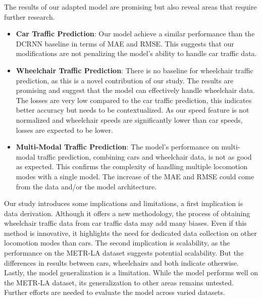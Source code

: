 The results of our adapted model are promising but also reveal areas that require further research.
\begin{itemize}
    \item \textbf{Car Traffic Prediction}:
    Our model achieve a similar performance than the DCRNN baseline in terms of MAE and RMSE\@.
    This suggests that our modifications are not penalizing the model's ability to handle car traffic data.
    \item \textbf{Wheelchair Traffic Prediction}:
    There is no baseline for wheelchair traffic prediction, as this is a novel contribution of our study.
    The results are promising and suggest that the model can effectively handle wheelchair data.
    The losses are very low compared to the car traffic prediction, this indicates better accuracy but needs to be
    contextualized.
    As our speed feature is not normalized and wheelchair speeds are significantly lower than car speeds, losses are
    expected to be lower.
    \item \textbf{Multi-Modal Traffic Prediction}:
    The model's performance on multi-modal traffic prediction, combining cars and wheelchair data, is not as good as
    expected.
    This confirms the complexity of handling multiple locomotion modes with a single model.
    The increase of the MAE and RMSE could come from the data and/or the model architecture.
\end{itemize}
\vspace{1em}

Our study introduces some implications and limitations, a first implication is data derivation.
Although it offers a new methodology, the process of obtaining wheelchair traffic data from car traffic data may add
many biases.
Even if this method is innovative, it highlights the need for dedicated data collection on other locomotion modes than
cars.
The second implication is scalability, as the performance on the METR-LA dataset suggests potential scalability.
But the differences in results between cars, wheelchairs and both indicate otherwise.
Lastly, the model generalization is a limitation.
While the model performs well on the METR-LA dataset, its generalization to other areas remains untested.
Further efforts are needed to evaluate the model across varied datasets.
\vspace{1em}

